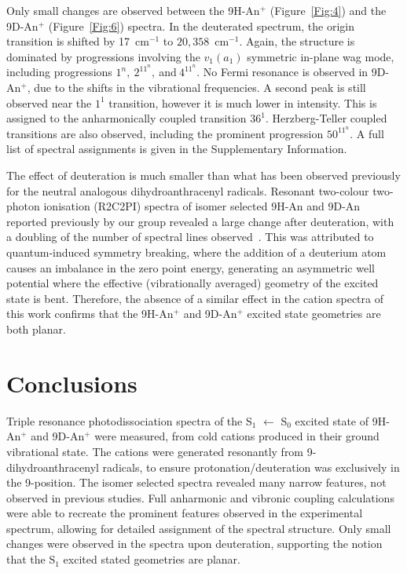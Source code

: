 \documentclass[journal=jpcafh,manuscript=article,layout=onecolumn, 12pt]{achemso}
\begin{document}
Only small changes are observed between the 9H-An$^+$ (Figure~\ref{Fig:4}) and the 9D-An$^+$ (Figure~\ref{Fig:6}) spectra. In the deuterated spectrum, the origin transition is shifted by 17~cm$^{-1}$ to $20,358$~cm$^{-1}$. Again, the structure is dominated by progressions involving the $v_1 (a_1)$ symmetric in-plane wag mode, including progressions $1^n,~2^11^n,~$and$~4^11^n$. No Fermi resonance is observed in 9D-An$^+$, due to the shifts in the vibrational frequencies. A second peak is still observed near the $1^1$ transition, however it is much lower in intensity. This is assigned to the anharmonically coupled transition $36^1$. Herzberg-Teller coupled transitions are also observed, including the prominent progression $50^11^n$. A full list of spectral assignments is given in the Supplementary Information.

The effect of deuteration is much smaller than what has been observed previously for the neutral analogous dihydroanthracenyl radicals. Resonant two-colour two-photon ionisation (R2C2PI) spectra of isomer selected 9H-An and 9D-An reported previously by our group revealed a large change after deuteration, with a doubling of the number of spectral lines observed~\cite{kre19}. This was attributed to quantum-induced symmetry breaking, where the addition of a deuterium atom causes an imbalance in the zero point energy, generating an asymmetric well potential where the effective (vibrationally averaged) geometry of the excited state is bent. Therefore, the absence of a similar effect in the cation spectra of this work confirms that the 9H-An$^+$ and 9D-An$^+$ excited state geometries are both planar.

\section{Conclusions}
Triple resonance photodissociation spectra of the S$_1$ $\leftarrow$ S$_0$ excited state of 9H-An$^+$ and 9D-An$^+$ were measured, from cold cations produced in their ground vibrational state. The cations were generated resonantly from  9-dihydroanthracenyl radicals, to ensure protonation/deuteration was exclusively in the 9-position. The isomer selected spectra revealed many narrow features, not observed in previous studies. Full anharmonic and vibronic coupling calculations were able to recreate the prominent features observed in the experimental spectrum, allowing for detailed assignment of the spectral structure. Only small changes were observed in the spectra upon deuteration, supporting the notion that the S$_1$ excited stated geometries are planar.
\end{document}

